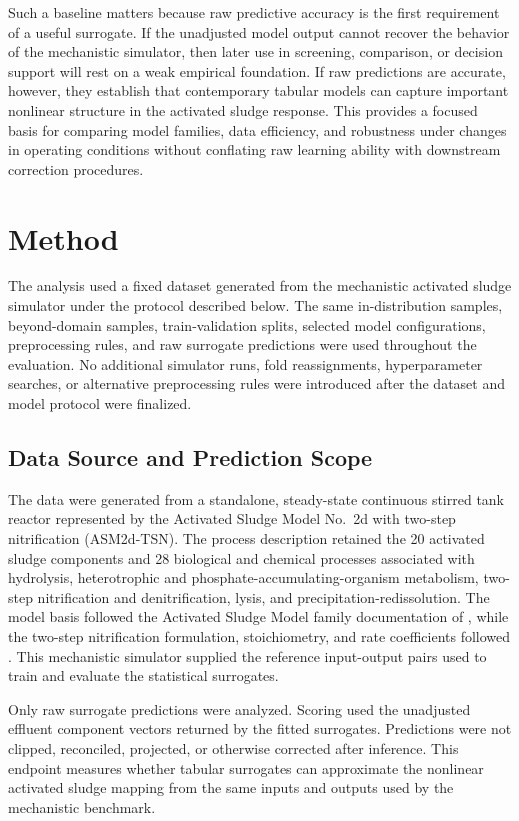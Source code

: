 \documentclass[12pt, twoside]{book}
\begin{document}
Such a baseline matters because raw predictive accuracy is the first requirement of a useful surrogate. If
the unadjusted model output cannot recover the behavior of the mechanistic simulator, then later use in
screening, comparison, or decision support will rest on a weak empirical foundation. If raw predictions are
accurate, however, they establish that contemporary tabular models can capture important nonlinear structure
in the activated sludge response. This provides a focused basis for comparing model families, data efficiency,
and robustness under changes in operating conditions without conflating raw learning ability with downstream
correction procedures.

\section{Method}

The analysis used a fixed dataset generated from the mechanistic activated sludge simulator under the protocol
described below. The same in-distribution samples, beyond-domain samples, train-validation splits, selected
model configurations, preprocessing rules, and raw surrogate predictions were used throughout the evaluation.
No additional simulator runs, fold reassignments, hyperparameter searches, or alternative preprocessing rules
were introduced after the dataset and model protocol were finalized.

\subsection{Data Source and Prediction Scope}

The data were generated from a standalone, steady-state continuous stirred tank reactor represented by the
Activated Sludge Model No.\ 2d with two-step nitrification (ASM2d-TSN). The process description retained the 20
activated sludge components and 28 biological and chemical processes associated with hydrolysis, heterotrophic
and phosphate-accumulating-organism metabolism, two-step nitrification and denitrification, lysis, and
precipitation-redissolution. The model basis followed the Activated Sludge Model family documentation of
\citet{Henze2006}, while
the two-step nitrification formulation, stoichiometry, and rate coefficients followed
\citet{Guerrero2011}. This mechanistic simulator supplied the reference input-output pairs used to train and
evaluate the statistical surrogates.

Only raw surrogate predictions were analyzed. Scoring used the unadjusted effluent component vectors returned
by the fitted surrogates. Predictions were not clipped, reconciled, projected, or otherwise corrected after
inference. This endpoint measures whether tabular surrogates can approximate the nonlinear activated sludge
mapping from the same inputs and outputs used by the mechanistic benchmark.
\end{document}
